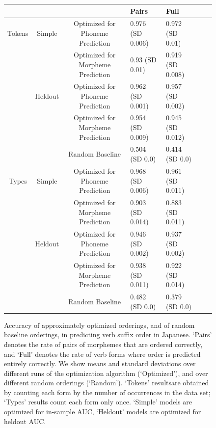 \documentclass[11pt,letterpaper]{article}
\begin{document}
\begin{figure}
\begin{center}
\begin{tabular}{ccc||llll}
	& &              &       Pairs & Full \\ \hline\hline
	Tokens &	Simple & Optimized for Phoneme Prediction   &   0.976 (SD 0.006) & 0.972 (SD 0.01) \\
	&	& Optimized for Morpheme Prediction  &   0.93 (SD 0.01) & 0.919 (SD 0.008) \\ \hline
	&	Heldout & Optimized for Phoneme Prediction   &   0.962 (SD 0.001) & 0.957 (SD 0.002) \\
	&	& Optimized for Morpheme Prediction  &   0.954 (SD 0.009) & 0.945 (SD 0.012) \\ \hline
	&	&	Random Baseline    &  0.504 (SD 0.0) & 0.414 (SD 0.0) \\ \hline \hline
	Types & Simple & Optimized for Phoneme Prediction   &   0.968 (SD 0.006) & 0.961 (SD 0.011) \\
	& & Optimized for Morpheme Prediction  &   0.903 (SD 0.014) & 0.883 (SD 0.011) \\ \hline
	& Heldout & Optimized for Phoneme Prediction   &   0.946 (SD 0.002) & 0.937 (SD 0.002) \\
	& & Optimized for Morpheme Prediction  &   0.938 (SD 0.011) & 0.922 (SD 0.014) \\ \hline
	& & Random Baseline    &  0.482 (SD 0.0) & 0.379 (SD 0.0) \\
\end{tabular}
\end{center}
\caption{Accuracy of approximately optimized orderings, and of random baseline orderings, in predicting verb suffix order in Japanese. `Pairs' denotes the rate of pairs of morphemes that are ordered correctly, and `Full' denotes the rate of verb forms where order is predicted entirely correctly. We show means and standard deviations over different runs of the optimization algorithm (`Optimized'), and over different random orderings (`Random'). `Tokens' resultsare obtained by counting each form by the number of occurrences in the data set; `Types' results count each form only once. `Simple' models are optimized for in-sample AUC, `Heldout' models are optimized for heldout AUC.}\label{fig:acc-japanese}
\end{figure}
\end{document}

